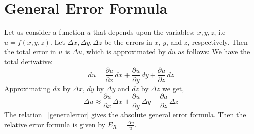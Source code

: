 \documentclass[aima203_lecturenotes_ku.tex]{subfiles}
\begin{document}
\section{General Error Formula}
Let us consider a function $u$ that depends upon the variables: $x,y,z$, i.e $u=f(x,y,z)$. Let $\Delta x, \Delta y, \Delta z$ be the errors in $x$, $y$, and $z$, respectively. Then the total error in $u$ is $\Delta u$, which is approximated by $du$ as follows: We have the total derivative:
\begin{equation}
  \label{totalderive}
  du = \frac{\partial u}{\partial x} \,dx + \frac{\partial u}{\partial y} \,dy + \frac{\partial u}{\partial z} \,dz
\end{equation}
Approximating $dx$ by $\Delta x $, $dy$ by $\Delta y$ and $dz$ by $\Delta z$ we get,
\begin{equation}
  \label{generalerror}
  \Delta u \approx  \frac{\partial u}{\partial x} \,\Delta x + \frac{\partial u}{\partial y} \,\Delta y + \frac{\partial u}{\partial z} \,\Delta z
\end{equation}
The relation ~\ref{generalerror} gives the absolute general error formula. Then the relative error formula is given by $E_R = \frac{\Delta u}{u}$.
\end{document}
